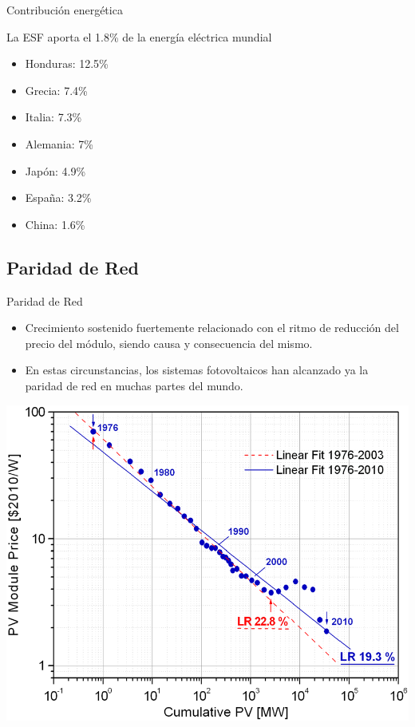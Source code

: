 \documentclass[xcolor={usenames,svgnames,dvipsnames}]{beamer}
\begin{document}
\begin{frame}[label={sec:orgc83bde6}]{Contribución energética}
\begin{block}{La ESF aporta el 1.8\% de la energía eléctrica mundial}
\begin{itemize}
\item Honduras: 12.5\%
\item Grecia: 7.4\%
\item Italia: 7.3\%
\item Alemania: 7\%
\item Japón: 4.9\%
\item España: 3.2\%
\item China: 1.6\%
\end{itemize}
\end{block}
\end{frame}

\subsection{Paridad de Red}
\label{sec:orgb6f61c9}

\begin{frame}[label={sec:org7158506}]{Paridad de Red}
\begin{itemize}
\item Crecimiento sostenido fuertemente relacionado con el ritmo de
reducción del precio del módulo, siendo causa y consecuencia del
mismo.

\item En estas circunstancias, los sistemas fotovoltaicos han alcanzado ya
la paridad de red en muchas partes del mundo.
\end{itemize}
\end{frame}


\begin{frame}[label={sec:org9575a56}]{}
\begin{center}
\includegraphics[width=.9\linewidth]{../figs/CurvaAprendizajeFV_BreyerPiP.png}
\end{center}
\end{frame}
\end{document}

